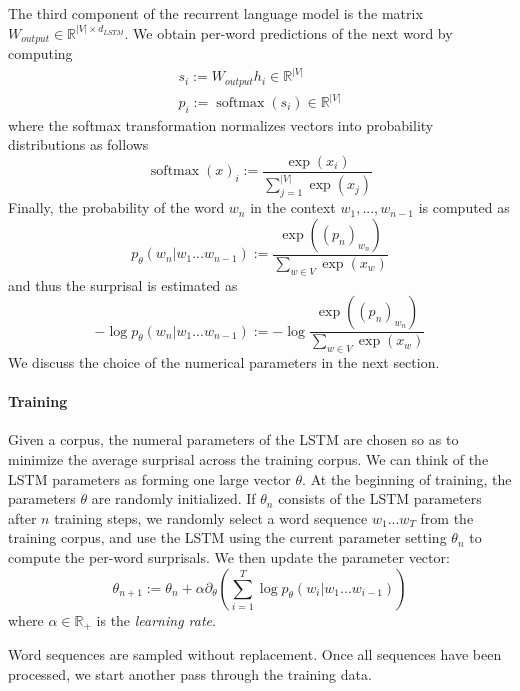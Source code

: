 \documentclass[11pt,letterpaper]{article}
\begin{document}
The third component of the recurrent language model is the matrix $W_{output} \in \mathbb{R}^{|V| \times d_{LSTM}}$.
We obtain per-word predictions of the next word by computing
\begin{align*}
	s_i := W_{output} h_i \in \mathbb{R}^{|V|} \\
	p_i := \operatorname{softmax}(s_i)\in \mathbb{R}^{|V|} 
\end{align*}
where the softmax transformation normalizes vectors into probability distributions as follows
\begin{equation}
	\operatorname{softmax}(x)_i := \frac{\exp(x_i)}{\sum_{j=1}^{|V|} \exp(x_j)}
\end{equation}
Finally, the probability of the word $w_n$ in the context $w_1, ..., w_{n-1}$ is computed as
\begin{equation}
	p_\theta(w_n|w_1...w_{n-1}) := \frac{\exp((p_n)_{w_n})}{\sum_{w \in V} \exp(x_w)}
\end{equation}
and thus the surprisal is estimated as
\begin{equation}
- \log	p_\theta(w_n|w_1...w_{n-1}) := -\log \frac{\exp((p_n)_{w_n})}{\sum_{w \in V} \exp(x_w)}
\end{equation}
We discuss the choice of the numerical parameters in the next section.



\paragraph{Training}
Given a corpus, the numeral parameters of the LSTM are chosen so as to minimize the average surprisal across the training corpus.
We can think of the LSTM parameters as forming one large vector $\theta$.
At the beginning of training, the parameters $\theta$ are randomly initialized.
If $\theta_n$ consists of the LSTM parameters after $n$ training steps, we randomly select a word sequence $w_1 ... w_T$ from the training corpus, and use the LSTM using the current parameter setting $\theta_n$ to compute the per-word surprisals.
We then update the parameter vector:
\begin{equation}\label{eq:train}
	\theta_{n+1} := \theta_n + \alpha \partial_\theta \left(\sum_{i=1}^T \log p_\theta(w_i|w_1...w_{i-1})\right)
\end{equation}
where $\alpha \in \mathbb{R}_+$ is the \emph{learning rate}.

Word sequences are sampled without replacement.
Once all sequences have been processed, we start another pass through the training data.
\end{document}
